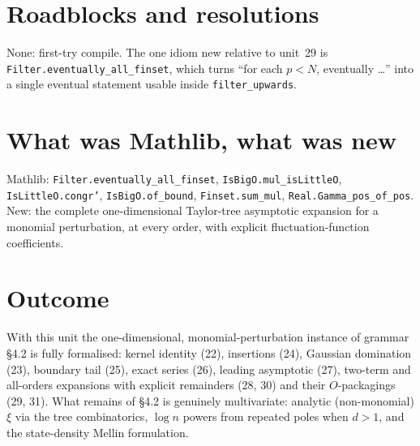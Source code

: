 \documentclass[11pt]{article}
\begin{document}
\section{Roadblocks and resolutions}
None: first-try compile. The one idiom new relative to unit~29 is
\texttt{Filter.eventually\_all\_finset}, which turns ``for each $p<N$, eventually \dots'' into a single
eventual statement usable inside \texttt{filter\_upwards}.

\section{What was Mathlib, what was new}
Mathlib: \texttt{Filter.eventually\_all\_finset}, \texttt{IsBigO.mul\_isLittleO},
\texttt{IsLittleO.congr'}, \texttt{IsBigO.of\_bound}, \texttt{Finset.sum\_mul},
\texttt{Real.Gamma\_pos\_of\_pos}. New: the complete one-dimensional Taylor-tree asymptotic expansion for
a monomial perturbation, at every order, with explicit fluctuation-function coefficients.

\section{Outcome}
With this unit the one-dimensional, monomial-perturbation instance of grammar \S4.2 is fully formalised:
kernel identity (22), insertions (24), Gaussian domination (23), boundary tail (25), exact series (26),
leading asymptotic (27), two-term and all-orders expansions with explicit remainders (28, 30) and their
$O$-packagings (29, 31). What remains of \S4.2 is genuinely multivariate: analytic (non-monomial) $\xi$
via the tree combinatorics, $\log n$ powers from repeated poles when $d>1$, and the state-density Mellin
formulation.
\end{document}
